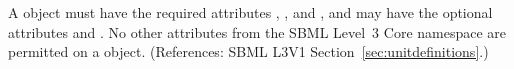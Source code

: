 A \Unit object must have the required attributes ,
,  and , and may have the
optional attributes   and .  No other
attributes from the SBML Level~3 Core namespace are permitted on a \Unit
object.  (References: SBML L3V1 Section~\ref{sec:unitdefinitions}.)
